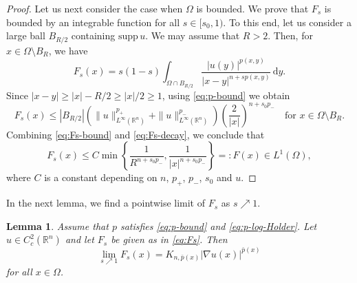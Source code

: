 \documentclass[11pt]{amsart}
\theoremstyle{plain}
\newtheorem{lemma}[theorem]{Lemma}
\theoremstyle{definition}
\numberwithin{equation}{section}
\begin{document}
\begin{proof}
Let us next consider the case when $\Omega$ is bounded. We prove that $F_{s}$ is bounded by an integrable function for all $s \in [s_{0},1)$. To this end, let us consider a large ball $B_{R/2}$ containing $\mathrm{supp} \,u$. We may assume that $R > 2$. Then, for $x \in \Omega \setminus B_{R}$, we have
\begin{equation*}
F_{s}(x) = s(1-s) \int_{\Omega \cap B_{R/2}} \frac{|u(y)|^{p(x, y)}}{|x-y|^{n+sp(x, y)}} \,\mathrm{d}y.
\end{equation*}
Since $|x-y| \geq |x|-R/2 \geq |x|/2 \geq 1$, using \eqref{eq:p-bound} we obtain
\begin{equation} \label{eq:Fs-decay}
F_{s}(x) \leq |B_{R/2}| \left( \|u\|_{L^{\infty}(\mathbb{R}^{n})}^{p_{+}} + \|u\|_{L^{\infty}(\mathbb{R}^{n})}^{p_{-}} \right) \left( \frac{2}{|x|} \right)^{n+s_{0} p_{-}} \quad\text{for } x \in \Omega \setminus B_{R}.
\end{equation}
Combining \eqref{eq:Fs-bound} and \eqref{eq:Fs-decay}, we conclude that
\begin{equation*}
F_{s}(x) \leq C \min \left\lbrace \frac{1}{R^{n+s_{0}p_{-}}}, \frac{1}{|x|^{n+s_{0}p_{-}}} \right\rbrace =: F(x) \in L^{1}(\Omega),
\end{equation*}
where $C$ is a constant depending on $n$, $p_{+}$, $p_{-}$, $s_{0}$ and $u$.
\end{proof}

In the next lemma, we find a pointwise limit of $F_{s}$ as $s \nearrow 1$.

\begin{lemma} \label{lem:limit-Fs}
Assume that $p$ satisfies \eqref{eq:p-bound} and \eqref{eq:p-log-Holder}. Let $u \in C^{2}_{c}(\mathbb{R}^{n})$ and let $F_{s}$ be given as in \eqref{eq:Fs}. Then
\begin{equation*}
\lim_{s \nearrow 1} F_{s}(x) = K_{n, \bar{p}(x)} |\nabla u(x)|^{\bar{p}(x)}
\end{equation*}
for all $x \in \Omega$.
\end{lemma}
\end{document}
